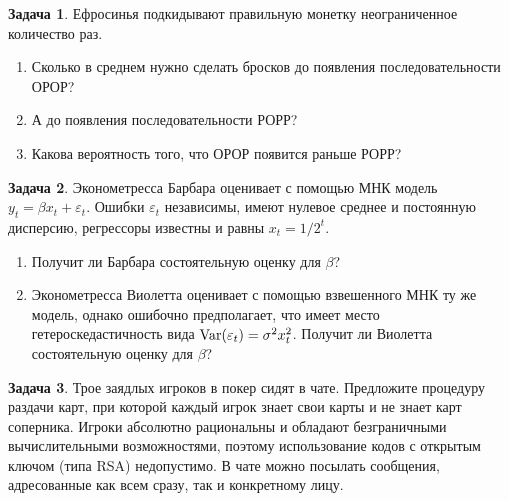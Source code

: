 \documentclass[final,pdftex]{../../template/epsilonj}
\theoremstyle{definition} %
\newtheorem{zadacha}{Задача}
\begin{document}
\begin{zadacha}
Ефросинья подкидывают правильную монетку неограниченное количество раз. 

\begin{enumerate}
\item Сколько в среднем нужно сделать бросков до появления последовательности ОРОР? 
\item А до появления последовательности РОРР?
\item Какова вероятность того, что ОРОР появится раньше РОРР?
\end{enumerate}

\end{zadacha}

\begin{zadacha}
Эконометресса Барбара оценивает с помощью МНК модель $y_t=\beta x_t+\varepsilon_t$. Ошибки $\varepsilon_t$ независимы, имеют нулевое среднее и постоянную дисперсию, регрессоры известны и равны $x_t=1/2^t$. 
\begin{enumerate}
\item Получит ли Барбара состоятельную оценку для $\beta$?
\item Эконометресса Виолетта оценивает с помощью взвешенного МНК ту же модель, однако ошибочно предполагает, что имеет место гетероскедастичность вида $\operatorname{Var}(\varepsilon_t)=\sigma^2 x_t^2$. Получит ли Виолетта состоятельную оценку для $\beta$?
\end{enumerate}
\end{zadacha}

\begin{zadacha}
Трое заядлых игроков в покер сидят в чате. Предложите процедуру раздачи карт, при которой каждый игрок знает свои карты и не знает карт соперника. Игроки абсолютно рациональны и обладают безграничными вычислительными возможностями, поэтому использование кодов с открытым ключом (типа RSA) недопустимо. В чате можно посылать сообщения, адресованные как всем сразу, так и конкретному лицу.
\end{zadacha}
\end{document}
